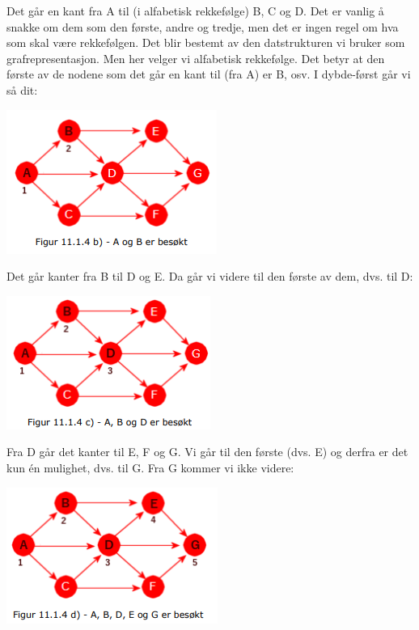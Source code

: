 \documentclass[11pt]{article}
\begin{document}
            \begin{multicols}{2}
                Det går en kant fra A til (i alfabetisk rekkefølge) B, C og D. Det er vanlig å snakke om dem
                som den første, andre og tredje, men det er ingen regel om hva som skal være rekkefølgen.
                Det blir bestemt av den datstrukturen vi bruker som grafrepresentasjon. Men her velger vi
                alfabetisk rekkefølge. Det betyr at den første av de nodene som det går en kant til (fra A) er
                B, osv. I dybde-først går vi så dit: 

                \columnbreak

                \includegraphics[center]{f-11.1.4b.png}
                
            \end{multicols}
            \begin{multicols}{2}
                Det går kanter fra B til D og E. Da går vi videre til den første av dem, dvs. til D:  

                \columnbreak

                \includegraphics[center]{f-11.1.4c.png}
                
            \end{multicols}
            \begin{multicols}{2}
                Fra D går det kanter til E, F og G. Vi går til den første (dvs. E) og derfra er det kun én
                mulighet, dvs. til G. Fra G kommer vi ikke videre:  

                \columnbreak

                \includegraphics[center]{f-11.1.4d.png}
                
            \end{multicols}
\end{document}
